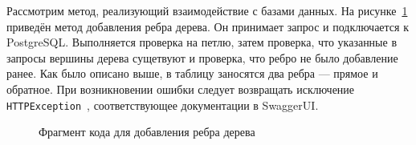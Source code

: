 Рассмотрим метод, реализующий взаимодействие с базами данных. На рисунке~\ref{src3} приведён метод добавления ребра дерева. Он принимает запрос и подключается к PostgreSQL. Выполняется проверка на петлю, затем проверка, что указанные в запросы вершины дерева сущетвуют и проверка, что ребро не было добавление ранее. Как было описано выше, в таблицу заносятся два ребра --- прямое и обратное. При возникновении ошибки следует возвращать исключение \texttt{HTTPException}~\cite{FastAPI-error}, соответствующее документации в SwaggerUI.

\begin{figure}
  \fontsize{12pt}{14pt}\selectfont
  
  \caption{Фрагмент кода для добавления ребра дерева}
  \label{src3}
\end{figure}
